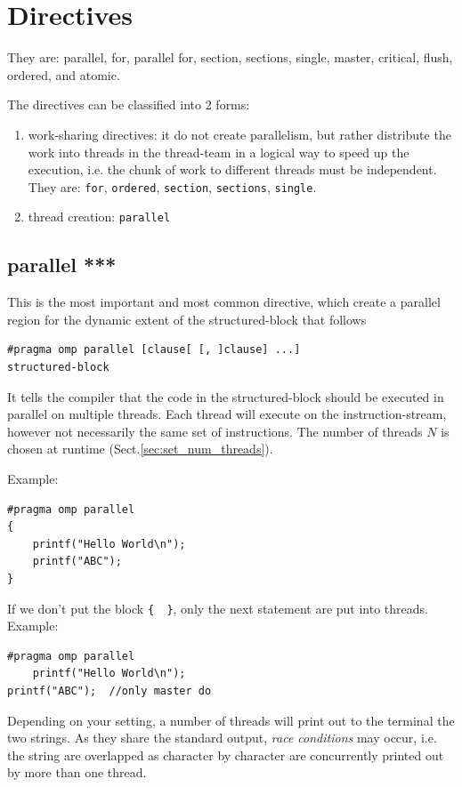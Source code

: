 \section{Directives}
\label{sec:openmp_directives}

They are: parallel, for, parallel for, section, sections, single, master, critical, flush,
ordered, and atomic.

The directives can be classified into 2 forms:
\begin{enumerate}
  \item work-sharing directives: it do not create parallelism, but rather
  distribute the work into threads in the thread-team in a logical way to speed
  up the execution, i.e. the chunk of work to different threads must be
  independent.   They are:
  \verb!for!, \verb!ordered!, \verb!section!, \verb!sections!, \verb!single!.
  \item thread creation: \verb!parallel!
\end{enumerate}


\subsection{parallel ***}

This is the most important and most common directive, which create a parallel
region for the dynamic extent of the structured-block that follows
\begin{verbatim}
#pragma omp parallel [clause[ [, ]clause] ...] 
structured-block
\end{verbatim}
It tells the compiler that the code in the structured-block should be executed
in parallel on multiple threads. Each thread will execute on the 
instruction-stream, however not necessarily the same set of instructions. The
number of threads $N$ is chosen at runtime (Sect.\ref{sec:set_num_threads}).

Example:
\begin{verbatim}
#pragma omp parallel
{ 
    printf("Hello World\n");
    printf("ABC");
}
\end{verbatim}
If we don't put the block \verb!{  }!, only the next statement are put into
threads. Example:
\begin{verbatim}
#pragma omp parallel 
    printf("Hello World\n");
printf("ABC");  //only master do
\end{verbatim}

Depending on your setting, a number of threads will print out to the terminal
the two strings. As they share the  standard output, {\it race conditions}
may occur, i.e. the string are overlapped as character by character are
concurrently printed out by more than one thread.

